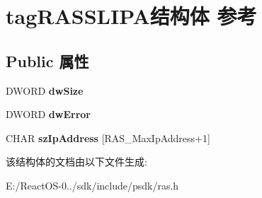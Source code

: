 \hypertarget{structtag_r_a_s_s_l_i_p_a}{}\section{tag\+R\+A\+S\+S\+L\+I\+P\+A结构体 参考}
\label{structtag_r_a_s_s_l_i_p_a}
\subsection*{Public 属性}
\begin{DoxyCompactItemize}
\item 
\mbox{\label{structtag_r_a_s_s_l_i_p_a_ad4d17c38977d679b2cc7d54469dc7a39}} 
D\+W\+O\+RD {\bfseries dw\+Size}
\item 
\mbox{\label{structtag_r_a_s_s_l_i_p_a_ae27d565e2fd5c73f6e89961272b038eb}} 
D\+W\+O\+RD {\bfseries dw\+Error}
\item 
\mbox{\label{structtag_r_a_s_s_l_i_p_a_a38fa3ecfb5edb092aa7968a2ae1c7ff0}} 
C\+H\+AR {\bfseries sz\+Ip\+Address} \mbox{[}R\+A\+S\+\_\+\+Max\+Ip\+Address+1\mbox{]}
\end{DoxyCompactItemize}


该结构体的文档由以下文件生成\+:\begin{DoxyCompactItemize}
\item 
E\+:/\+React\+O\+S-\/0../sdk/include/psdk/ras.\+h\end{DoxyCompactItemize}
